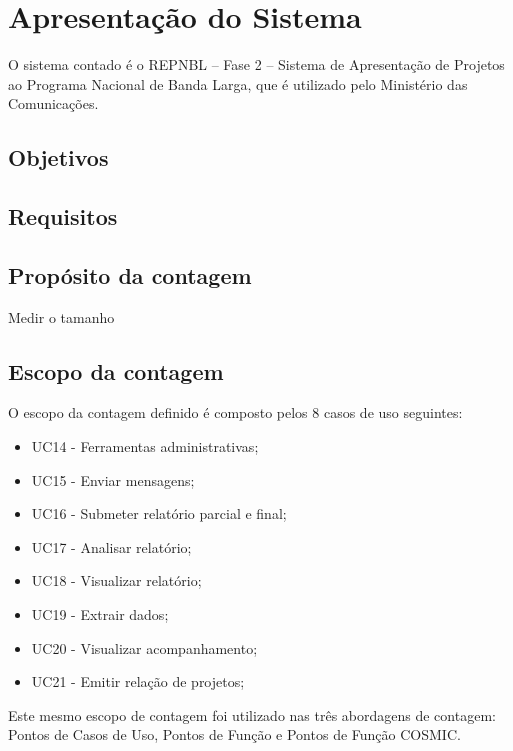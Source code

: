 \chapter{Apresentação do Sistema}

O sistema contado é o REPNBL – Fase 2 – Sistema de Apresentação de Projetos ao Programa Nacional de Banda Larga,
que é utilizado pelo Ministério das Comunicações.

\section{Objetivos}

	
\section{Requisitos}

\section{Propósito da contagem}
	Medir o tamanho 

\section{Escopo da contagem}
  
  O escopo da contagem definido é composto pelos 8 casos de uso seguintes:
	 
  \begin{itemize}
	  

      \item UC14 - Ferramentas administrativas;
      \item UC15 - Enviar mensagens;
      \item UC16 - Submeter relatório parcial e final;
      \item UC17 - Analisar relatório;
      \item UC18 - Visualizar relatório;
      \item UC19 - Extrair dados;
      \item UC20 - Visualizar acompanhamento;
      \item UC21 - Emitir relação de projetos;	

  \end{itemize}
  
  Este mesmo escopo de contagem foi utilizado nas três abordagens de contagem: Pontos de Casos de Uso, Pontos de Função e Pontos de Função COSMIC.